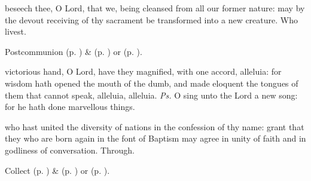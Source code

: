 
\postcommunion
{} beseech thee, O Lord, that we, being cleansed from all our former nature: may by the devout receiving of thy sacrament be transformed into a new creature. Who livest.
\begin{rubric}
     Postcommunion  (p. \pageref{EasterPostcommunion}) \&   (p. \pageref{SPAgainst}) or  (p. \pageref{SPChiefBishop}).
\end{rubric}




\introit
{} victorious hand, O Lord, have they magnified, with one accord, alleluia: for wisdom hath opened the mouth of the dumb, and made eloquent the tongues of them that cannot speak, alleluia, alleluia. \textit{Ps.} O sing unto the Lord a new song: for he hath done marvellous things.

\collect
{} who hast united the diversity of nations in the confession of thy name: grant that they who are born again in the font of Baptism may agree in unity of faith and in godliness of conversation. Through.
\begin{rubric}
     Collect  (p. \pageref{EasterCollect}) \&   (p. \pageref{SPAgainst}) or  (p. \pageref{SPChiefBishop}).
\end{rubric}


